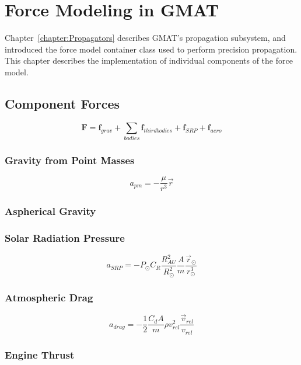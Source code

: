 \chapter{\label{chapter:ForceModel}Force Modeling in GMAT}

Chapter~\ref{chapter:Propagators} describes GMAT's propagation subsystem, and introduced the force
model container class used to perform precision propagation.  This chapter describes the
implementation of individual components of the force model.

\section{Component Forces}

\begin{equation}
 \textbf{F} = \textbf{f}_{grav} + \sum_{bodies} \textbf{f}_{third bodies} + \textbf{f}_{SRP} +
\textbf{f}_{aero}
\end{equation}


\subsection{\label{section:PointMassModel}Gravity from Point Masses}

\begin{equation}\label{eq:pmGravity}
    a_{pm} = -\frac{\mu}{r^3}{\vec r}
\end{equation}

\subsection{\label{section:FullFieldModel}Aspherical Gravity}

\subsection{\label{section:SRPModel}Solar Radiation Pressure}

\begin{equation}\label{eq:SRP}
    a_{SRP} = -P_\odot C_R \frac{R_{AU}^2}{R_\odot^2} \frac{A}{m} \frac{\vec r_\odot}{r_\odot^3}
\end{equation}

\subsection{\label{section:DragModel}Atmospheric Drag}

\begin{equation}\label{eq:Drag}
    a_{drag} = -\frac{1}{2} \frac{C_d A}{m} \rho v_{rel}^2 \frac{\vec v_{rel}}{v_{rel}}
\end{equation}

\subsection{\label{section:ThrustModel}Engine Thrust}

